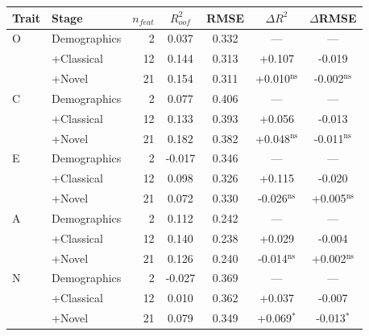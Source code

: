 \begin{tabular}{llrcccc}
\toprule
Trait & Stage & $n_{feat}$ & $R^2_{oof}$ & RMSE & $\Delta R^2$ & $\Delta$RMSE \\
\midrule
O & Demographics & 2 & 0.037 & 0.332 & --- & --- \\
 & +Classical & 12 & 0.144 & 0.313 & +0.107 & -0.019 \\
 & +Novel & 21 & 0.154 & 0.311 & +0.010$^{\mathrm{ns}}$ & -0.002$^{\mathrm{ns}}$ \\
\midrule
C & Demographics & 2 & 0.077 & 0.406 & --- & --- \\
 & +Classical & 12 & 0.133 & 0.393 & +0.056 & -0.013 \\
 & +Novel & 21 & 0.182 & 0.382 & +0.048$^{\mathrm{ns}}$ & -0.011$^{\mathrm{ns}}$ \\
\midrule
E & Demographics & 2 & -0.017 & 0.346 & --- & --- \\
 & +Classical & 12 & 0.098 & 0.326 & +0.115 & -0.020 \\
 & +Novel & 21 & 0.072 & 0.330 & -0.026$^{\mathrm{ns}}$ & +0.005$^{\mathrm{ns}}$ \\
\midrule
A & Demographics & 2 & 0.112 & 0.242 & --- & --- \\
 & +Classical & 12 & 0.140 & 0.238 & +0.029 & -0.004 \\
 & +Novel & 21 & 0.126 & 0.240 & -0.014$^{\mathrm{ns}}$ & +0.002$^{\mathrm{ns}}$ \\
\midrule
N & Demographics & 2 & -0.027 & 0.369 & --- & --- \\
 & +Classical & 12 & 0.010 & 0.362 & +0.037 & -0.007 \\
 & +Novel & 21 & 0.079 & 0.349 & +0.069$^{*}$ & -0.013$^{*}$ \\
\bottomrule
\end{tabular}

